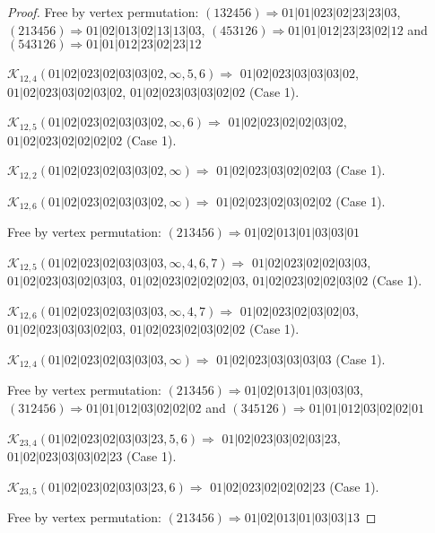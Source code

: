 \documentclass[12pt]{article}
\theoremstyle{plain}
\theoremstyle{definition}
\theoremstyle{remark}
\newcommand{\fancy}[1]{\mathcal{#1}}
\def\K{\fancy{K}}
\begin{document}
\begin{proof}
	
	
	Free by vertex permutation: $(1 3 2 4 5 6)\Rightarrow 01|01|023|02|23|23|03$, $(2 1 3 4 5 6)\Rightarrow 01|02|013|02|13|13|03$, $(4 5 3 1 2 6)\Rightarrow 01|01|012|23|23|02|12$ and $(5 4 3 1 2 6)\Rightarrow 01|01|012|23|02|23|12$
	
	
	
	\bigskip
	
	$\K_{12,4}(01|02|023|02|03|03|02,\infty,5, 6)\Rightarrow $ $01|02|023|03|03|03|02$, $01|02|023|03|02|03|02$, $01|02|023|03|03|02|02$ (Case 1).
	
	$\K_{12,5}(01|02|023|02|03|03|02,\infty,6)\Rightarrow $ $01|02|023|02|02|03|02$, $01|02|023|02|02|02|02$ (Case 1).
	
	$\K_{12,2}(01|02|023|02|03|03|02,\infty)\Rightarrow $ $01|02|023|03|02|02|03$ (Case 1).
	
	$\K_{12,6}(01|02|023|02|03|03|02,\infty)\Rightarrow $ $01|02|023|02|03|02|02$ (Case 1).
	
	
	
	Free by vertex permutation: $(2 1 3 4 5 6)\Rightarrow 01|02|013|01|03|03|01$
	
	
	
	\bigskip
	
	$\K_{12,5}(01|02|023|02|03|03|03,\infty,4, 6, 7)\Rightarrow $ $01|02|023|02|02|03|03$, $01|02|023|03|02|03|03$, $01|02|023|02|02|02|03$, $01|02|023|02|02|03|02$ (Case 1).
	
	$\K_{12,6}(01|02|023|02|03|03|03,\infty,4, 7)\Rightarrow $ $01|02|023|02|03|02|03$, $01|02|023|03|03|02|03$, $01|02|023|02|03|02|02$ (Case 1).
	
	$\K_{12,4}(01|02|023|02|03|03|03,\infty)\Rightarrow $ $01|02|023|03|03|03|03$ (Case 1).
	
	
	
	Free by vertex permutation: $(2 1 3 4 5 6)\Rightarrow 01|02|013|01|03|03|03$, $(3 1 2 4 5 6)\Rightarrow 01|01|012|03|02|02|02$ and $(3 4 5 1 2 6)\Rightarrow 01|01|012|03|02|02|01$
	
	
	
	\bigskip
	
	$\K_{23,4}(01|02|023|02|03|03|23,5, 6)\Rightarrow $ $01|02|023|03|02|03|23$, $01|02|023|03|03|02|23$ (Case 1).
	
	$\K_{23,5}(01|02|023|02|03|03|23,6)\Rightarrow $ $01|02|023|02|02|02|23$ (Case 1).
	
	
	
	Free by vertex permutation: $(2 1 3 4 5 6)\Rightarrow 01|02|013|01|03|03|13$
	

\end{proof}
\end{document}
